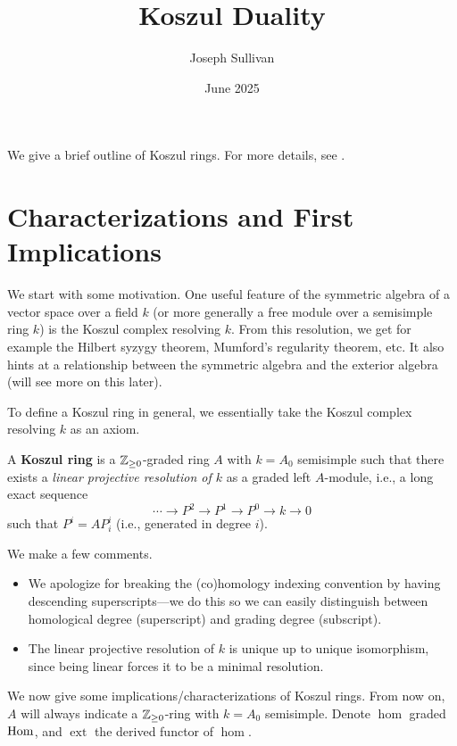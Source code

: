 \documentclass[12pt]{article}
\title{Koszul Duality}
\author{Joseph Sullivan}
\date{June 2025}
\DeclareMathOperator{\ext}{ext}
\begin{document}
\maketitle
\tableofcontents

We give a brief outline of Koszul rings. For more details, see \cite[Section 2]{Beilinson_Ginzburg_Soergel_1996}.

\section{Characterizations and First Implications}

We start with some motivation. One useful feature of the symmetric algebra of a vector space over a field $k$ (or more generally a free module over a semisimple ring $k$) is the Koszul complex resolving $k$. From this resolution, we get for example the Hilbert syzygy theorem, Mumford's regularity theorem, etc. It also hints at a relationship between the symmetric algebra and the exterior algebra (will see more on this later).

To define a Koszul ring in general, we essentially take the Koszul complex resolving $k$ as an axiom.

\begin{defn}
    A \textbf{Koszul ring} is a $\mathbb{Z}_{\geq 0}$-graded ring $A$ with $k=A_0$ semisimple such that there exists a \textit{linear projective resolution of $k$} as a graded left $A$-module, i.e., a long exact sequence
    \[\cdots \to P^2 \to P^1 \to P^0 \to k \to 0\]
    such that $P^i = A P^i_i$ (i.e., generated in degree $i$).
\end{defn}

\begin{rmk}
    We make a few comments.
    \begin{itemize}
        \item We apologize for breaking the (co)homology indexing convention by having descending superscripts---we do this so we can easily distinguish between homological degree (superscript) and grading degree (subscript).
        \item The linear projective resolution of $k$ is unique up to unique isomorphism, since being linear forces it to be a minimal resolution.
    \end{itemize}
\end{rmk}

We now give some implications/characterizations of Koszul rings. From now on, $A$ will always indicate a $\mathbb{Z}_{\geq 0}$-ring with $k=A_0$ semisimple. Denote $\hom$ graded $\mathrm{Hom}$, and $\ext$ the derived functor of $\hom$.
\end{document}
